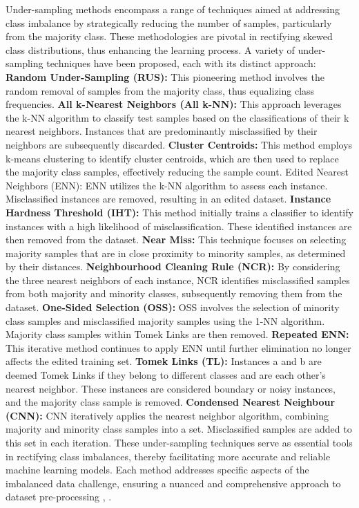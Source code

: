 Under-sampling methods encompass a range of techniques aimed at addressing class imbalance by strategically reducing the number of samples, particularly from the majority class. These methodologies are pivotal in rectifying skewed class distributions, thus enhancing the learning process. A variety of under-sampling techniques have been proposed, each with its distinct approach: 
\textbf{Random Under-Sampling (RUS):} This pioneering method involves the random removal of samples from the majority class, thus equalizing class frequencies. 
\textbf{All k-Nearest Neighbors (All k-NN):} This approach leverages the k-NN algorithm to classify test samples based on the classifications of their k nearest neighbors. Instances that are predominantly misclassified by their neighbors are subsequently discarded. 
\textbf{Cluster Centroids:} This method employs k-means clustering to identify cluster centroids, which are then used to replace the majority class samples, effectively reducing the sample count. Edited Nearest Neighbors (ENN): ENN utilizes the k-NN algorithm to assess each instance. Misclassified instances are removed, resulting in an edited dataset. 
\textbf{Instance Hardness Threshold (IHT): }This method initially trains a classifier to identify instances with a high likelihood of misclassification. These identified instances are then removed from the dataset. 
\textbf{Near Miss:} This technique focuses on selecting majority samples that are in close proximity to minority samples, as determined by their distances. 
\textbf{Neighbourhood Cleaning Rule (NCR):} By considering the three nearest neighbors of each instance, NCR identifies misclassified samples from both majority and minority classes, subsequently removing them from the dataset. 
\textbf{One-Sided Selection (OSS):} OSS involves the selection of minority class samples and misclassified majority samples using the 1-NN algorithm. Majority class samples within Tomek Links are then removed. 
\textbf{Repeated ENN:} This iterative method continues to apply ENN until further elimination no longer affects the edited training set. 
\textbf{Tomek Links (TL):} Instances a and b are deemed Tomek Links if they belong to different classes and are each other's nearest neighbor. These instances are considered boundary or noisy instances, and the majority class sample is removed. 
\textbf{Condensed Nearest Neighbour (CNN):} CNN iteratively applies the nearest neighbor algorithm, combining majority and minority class samples into a set. Misclassified samples are added to this set in each iteration. 
These under-sampling techniques serve as essential tools in rectifying class imbalances, thereby facilitating more accurate and reliable machine learning models. Each method addresses specific aspects of the imbalanced data challenge, ensuring a nuanced and comprehensive approach to dataset pre-processing \cite{Fotouhi2019}, \cite{Khushi2021}.

